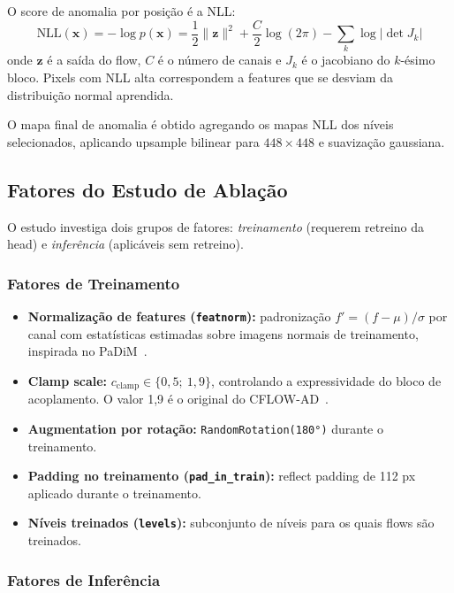 \documentclass[conference]{IEEEtran}
\begin{document}
O score de anomalia por posição é a NLL:
\begin{equation}
    \text{NLL}(\mathbf{x}) = -\log p(\mathbf{x}) = \frac{1}{2}\|\mathbf{z}\|^2 + \frac{C}{2}\log(2\pi) - \sum_k \log|\det J_k|
\end{equation}
onde $\mathbf{z}$ é a saída do flow, $C$ é o número de canais e $J_k$ é o jacobiano do $k$-ésimo bloco. Pixels com NLL alta correspondem a features que se desviam da distribuição normal aprendida.

O mapa final de anomalia é obtido agregando os mapas NLL dos níveis selecionados, aplicando upsample bilinear para $448 \times 448$ e suavização gaussiana.

\subsection{Fatores do Estudo de Ablação}
\label{sec:factors}

O estudo investiga dois grupos de fatores: \textit{treinamento} (requerem retreino da head) e \textit{inferência} (aplicáveis sem retreino).

\subsubsection{Fatores de Treinamento}

\begin{itemize}
    \item \textbf{Normalização de features (\texttt{featnorm}):} padronização $f' = (f - \mu) / \sigma$ por canal com estatísticas estimadas sobre imagens normais de treinamento, inspirada no PaDiM~\cite{defard2021padim}.
    \item \textbf{Clamp scale:} $c_{\text{clamp}} \in \{0{,}5;\ 1{,}9\}$, controlando a expressividade do bloco de acoplamento. O valor 1{,}9 é o original do CFLOW-AD~\cite{gudovskiy2022cflow}.
    \item \textbf{Augmentation por rotação:} \texttt{RandomRotation(180°)} durante o treinamento.
    \item \textbf{Padding no treinamento (\texttt{pad\_in\_train}):} reflect padding de 112 px aplicado durante o treinamento.
    \item \textbf{Níveis treinados (\texttt{levels}):} subconjunto de níveis para os quais flows são treinados.
\end{itemize}

\subsubsection{Fatores de Inferência}
\end{document}
